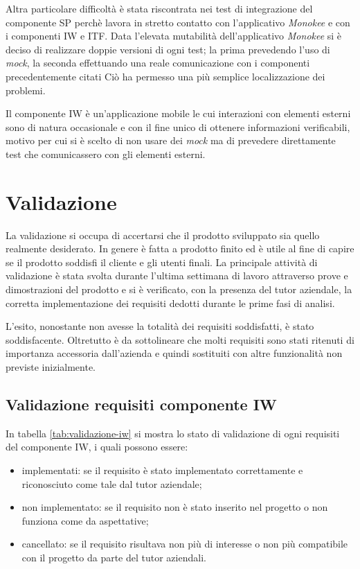 Altra particolare difficoltà è stata riscontrata nei test di integrazione del componente SP perchè lavora in stretto contatto con l'applicativo \emph{Monokee} e con i componenti IW e ITF. Data l'elevata mutabilità dell'applicativo \emph{Monokee} si è deciso di realizzare doppie versioni di ogni test; la prima prevedendo l'uso di \emph{mock}, la seconda effettuando una reale comunicazione con i componenti precedentemente citati
Ciò ha permesso una più semplice localizzazione dei problemi.

Il componente IW è un'applicazione mobile le cui interazioni con elementi esterni sono di natura occasionale e con il fine unico di ottenere informazioni verificabili, motivo per cui si è scelto di non usare dei \emph{mock} ma di prevedere direttamente test che comunicassero con gli elementi esterni.


\section{Validazione}
La validazione si occupa di accertarsi che il prodotto sviluppato sia quello realmente desiderato. In genere è fatta a prodotto finito ed è utile al fine di capire se il prodotto soddisfi il cliente e gli utenti finali. La principale attività di validazione è stata svolta durante l'ultima settimana di lavoro attraverso prove e dimostrazioni del prodotto e si è verificato, con la presenza del tutor aziendale, la corretta implementazione dei requisiti dedotti durante le prime fasi di analisi.

L'esito, nonostante non avesse la totalità dei requisiti soddisfatti, è stato soddisfacente. Oltretutto è da sottolineare che molti requisiti sono stati ritenuti di importanza accessoria dall'azienda e quindi sostituiti con altre funzionalità non previste inizialmente.


\subsection{Validazione requisiti componente IW}
In tabella \ref{tab:validazione-iw} si mostra lo stato di validazione di ogni requisiti del componente IW, i quali possono essere:
\begin{itemize}
    \item implementati: se il requisito è stato implementato correttamente e riconosciuto come tale dal tutor aziendale;
    \item non implementato: se il requisito non è stato inserito nel progetto o non funziona come da aspettative;
    \item cancellato: se il requisito risultava non più di interesse o non più compatibile con il progetto da parte del tutor aziendali.
\end{itemize}

